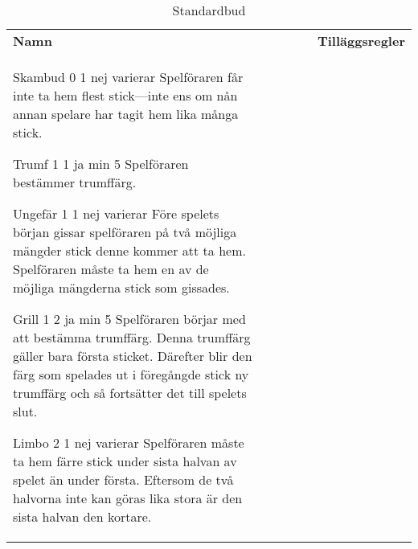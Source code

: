 %
%
%
%
%

\begin{table}
	\caption{Standardbud}\label{tab:standardBids}
	\begin{center}
		\begin{tabularx}{\textwidth}{
			l
			S[table-number-alignment=center, table-format=1.0]
			S[table-number-alignment=center, table-format=1.0]
			cc|X
		}
				\textbf{Namn} &
				 &
				 &
				 &
				 &
				\textbf{Tilläggsregler}
				\\[-3ex]

				\standardBidItem%
				{Skambud}
				{0}
				{1}
				{nej}
				{varierar}
				{%
					Spelföraren får inte ta hem flest stick---inte ens om nån annan spelare har tagit hem lika många stick.
				}

				\standardBidItem%
				{Trumf}
				{1}
				{1}
				{ja}
				{min 5}
				{%
					Spelföraren bestämmer trumffärg.
				}

				\standardBidItem%
				{Ungefär}
				{1}
				{1}
				{nej}
				{varierar}
				{%
					Före spelets början gissar spelföraren på två möjliga mängder stick denne kommer att ta hem. Spelföraren måste ta hem en av de möjliga mängderna stick som gissades.
				}

				\standardBidItem%
				{Grill}
				{1}
				{2}
				{ja}
				{min 5}
				{%
					Spelföraren börjar med att bestämma trumffärg. Denna trumffärg gäller bara första sticket. Därefter blir den färg som spelades ut i föregångde stick ny trumffärg och så fortsätter det till spelets slut.
				}

				\standardBidItem%
				{Limbo}
				{2}
				{1}
				{nej}
				{varierar}
				{%
					Spelföraren måste ta hem färre stick under sista halvan av spelet än under första. Eftersom de två halvorna inte kan göras lika stora är den sista halvan den kortare.
				}
				

\end{tabularx}
\end{center}
\end{table}
